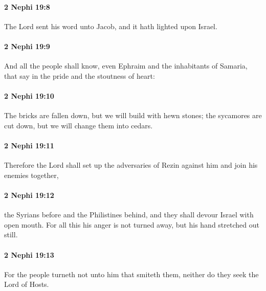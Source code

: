 		\paragraph{2 Nephi 19:8} %
			\label{2NEPHI-19-8}

			The Lord sent his word unto Jacob,
			and it hath lighted upon Israel.

		\paragraph{2 Nephi 19:9} %
			\label{2NEPHI-19-9}

			And all the people shall know,
			even Ephraim and the inhabitants of Samaria,
			that say in the pride and the stoutness of heart:

		\paragraph{2 Nephi 19:10} %
			\label{2NEPHI-19-10}

			The bricks are fallen down, but we will build with hewn stones;
			the sycamores are cut down, but we will change them into cedars.

		\paragraph{2 Nephi 19:11} %
			\label{2NEPHI-19-11}

			Therefore the Lord shall set up the adversaries of Rezin against him
			and join his enemies together,

		\paragraph{2 Nephi 19:12} %
			\label{2NEPHI-19-12}

			the Syrians before and the Philistines behind,
			and they shall devour Israel with open mouth.
			For all this his anger is not turned away, but his hand stretched out still.

		\paragraph{2 Nephi 19:13} %
			\label{2NEPHI-19-13}

			For the people turneth not unto him that smiteth them,
			neither do they seek the Lord of Hosts.

